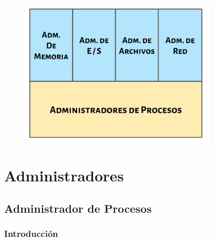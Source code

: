\documentclass[12pt, fleqn]{report}                             %
\begin{document}
            \begin{figure}[h!]
                \centering
                \includegraphics[width=0.85\textwidth]{PartesDelKernel}
            \end{figure}


\part{Administradores}
\clearpage



    \chapter{Administrador de Procesos}

        \clearpage
        \section{Introducción}
\end{document}

